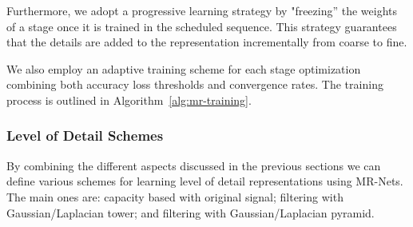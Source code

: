 Furthermore, we adopt a progressive learning strategy by "freezing” the weights of a stage once it is trained in the scheduled sequence. This strategy guarantees that the details are added to the representation incrementally from coarse to fine.

We also employ an adaptive training scheme for each stage optimization combining both accuracy loss thresholds and convergence rates. The training process is outlined in Algorithm~\ref{alg:mr-training}.



\subsubsection{Level of Detail Schemes}
\label{s:lod}

By combining the different aspects discussed in the previous sections we can define various schemes for learning level of detail representations using MR-Nets. The main ones are: capacity based with original signal; filtering with Gaussian/Laplacian tower; and filtering with Gaussian/Laplacian pyramid.

